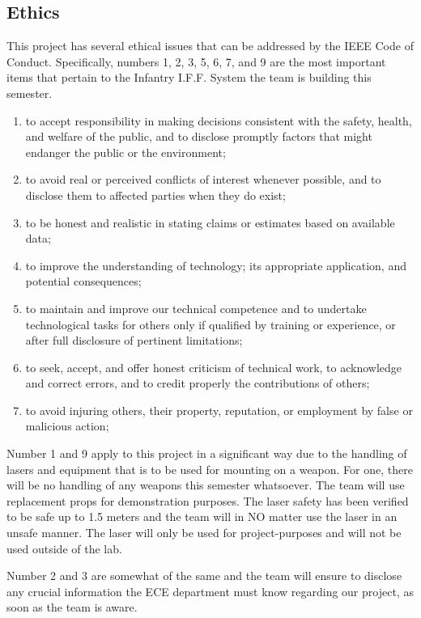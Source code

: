 \documentclass[letterpaper,10pt]{article}
\makeatletter
\newcommand{\skipitems}[1]{%
	\addtocounter{\@enumctr}{#1}%
}
\makeatother
\begin{document}
\begin{spacing}{1.15}
\subsection{Ethics}
This project has several ethical issues that can be addressed by the IEEE Code of Conduct. Specifically, numbers 1, 2, 3, 5, 6, 7, and 9 are the most important items that pertain to the Infantry I.F.F. System the team is building this semester. 
\begin{enumerate}
	\item to accept responsibility in making decisions consistent with the safety, health, and welfare of the public, and to disclose promptly factors that might endanger the public or the environment;
	\item to avoid real or perceived conflicts of interest whenever possible, and to disclose them to affected parties when they do exist;
	\item to be honest and realistic in stating claims or estimates based on available data;  
	\skipitems{1}
	\item to improve the understanding of technology; its appropriate application, and potential consequences;  
	\item to maintain and improve our technical competence and to undertake technological tasks for others only if qualified by training or experience, or after full disclosure of pertinent limitations;  
	\item to seek, accept, and offer honest criticism of technical work, to acknowledge and correct errors, and to credit properly the contributions of others;  
	\skipitems{1}
	\item to avoid injuring others, their property, reputation, or employment by false or malicious action;  
\end{enumerate}
Number 1 and 9 apply to this project in a significant way due to the handling of lasers and equipment that is to be used for mounting on a weapon. For one, there will be no handling of any weapons this semester whatsoever. The team will use replacement props for demonstration purposes. The laser safety has been verified to be safe up to 1.5 meters and the team will in NO matter use the laser in an unsafe manner. The laser will only be used for project-purposes and will not be used outside of the lab.

Number 2 and 3 are somewhat of the same and the team will ensure to disclose any crucial information the ECE department must know regarding our project, as soon as the team is aware. 


\end{spacing}
\end{document}
